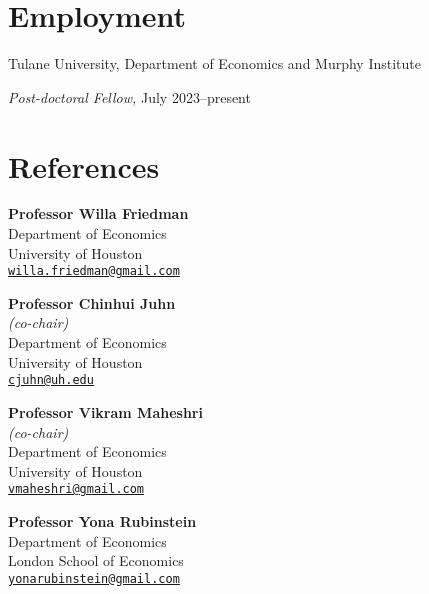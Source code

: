 \documentclass[10pt,letterpaper]{article}
\renewenvironment{itemize}{
  \begin{list}{}{
    \setlength{\leftmargin}{1.5em}
  }
}{
  \end{list}
}
\begin{document}
\section*{Employment}

\begin{itemize}
  \item Tulane University, Department of Economics and Murphy Institute
  \begin{itemize}
    \item \textit{Post-doctoral Fellow,} July 2023--present
  \end{itemize}
\end{itemize}

\section*{References}

\begin{minipage}[t]{0.45\textwidth}
   \textbf{Professor Willa Friedman}  \\
                   Department of Economics \\
                   University of Houston  \\
                   \href{mailto:willa.friedman@gmail.com}{\tt willa.friedman@gmail.com} \\
\end{minipage}
\begin{minipage}[t]{0.45\textwidth}
  \textbf{Professor Chinhui Juhn}  \\
  \textit{(co-chair)}  \\
                   Department of Economics \\
                   University of Houston  \\
                   \href{mailto:cjuhn@uh.edu}{\tt cjuhn@uh.edu} \\
\end{minipage}

\begin{minipage}[t]{0.45\textwidth}
   \textbf{Professor Vikram Maheshri}  \\
   \textit{(co-chair)}  \\
                   Department of Economics \\
                   University of Houston  \\
                   \href{mailto:vmaheshri@gmail.com}{\tt vmaheshri@gmail.com} \\
\end{minipage}
\begin{minipage}[t]{0.45\textwidth}
   \textbf{Professor Yona Rubinstein}  \\
                   Department of Economics \\
                   London School of Economics  \\
                   \href{mailto:yonarubinstein@gmail.com}{\tt yonarubinstein@gmail.com} \\
\end{minipage}
\end{document}
